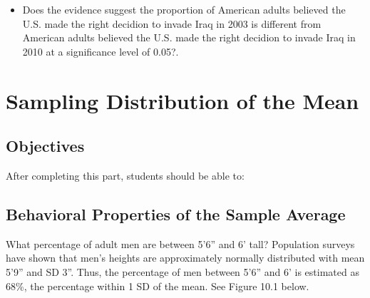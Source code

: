 \documentclass[11pt]{book}\usepackage[]{graphicx}\usepackage[]{color}
\begin{document}
\begin{exercises}
\begin{exercise}
\begin{itemize}
 \item Does the evidence suggest the proportion of  American adults believed the \\ U.S. made the right decidion to invade Iraq in 2003 is different from American adults believed the  U.S. made the right decidion to invade Iraq in 2010 at a significance level of 0.05?.  
\end{itemize}

\end{exercise}
\begin{solution}  %

\end{solution}
\end{exercises}

\onecolumn



\chapter{Sampling Distribution of the Mean}
\label{chap:ch11}

\section{Objectives}

After completing this part, students should be able to:


\section{Behavioral Properties of the Sample Average}

What percentage of adult men are between 5'6'' and 6' tall?  Population surveys have shown that men's heights are approximately normally distributed with mean 5'9'' and SD 3''.  Thus, the percentage of men between 5'6'' and 6' is estimated as 68\%, the percentage within 1 SD of the mean.  See Figure 10.1 below.
\end{document}

